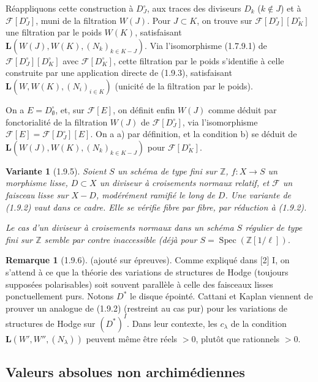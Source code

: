 \documentclass[12pt,a4paper]{article}
\theoremstyle{plain}
\newtheorem{variante}[theorem]{Variante}
\theoremstyle{definition}
\newtheorem{remark}[theorem]{Remarque}
\theoremstyle{remark}
\DeclareMathOperator{\Spec}{Spec}
\newcommand{\ZZ}{{\mathbb{Z}}}
\begin{document}
R\'eappliquons cette construction \`a $D_J^\circ$, aux traces des diviseurs $D_k$ ($k \notin J$) et \`a $\mathscr{F}[D_J^\circ]$, muni de la filtration $W(J)$. Pour $J \subset K$, on trouve sur $\mathscr{F}[D_J^\circ][D_K^\circ]$ une filtration par le poids $W(K)$, satisfaisant $\mathbf{L}(W(J), W(K), (N_k)_{k \in K-J})$. Via l'isomorphisme (1.7.9.1) de $\mathscr{F}[D_J^\circ][D_K^\circ]$ avec $\mathscr{F}[D_K^\circ]$, cette filtration par le poids s'identifie \`a celle construite par une application directe de (1.9.3), satisfaisant $\mathbf{L}(W, W(K), (N_i)_{i \in K})$ (unicit\'e de la filtration par le poids).

On a $E = D_\emptyset^\circ$, et, sur $\mathscr{F}[E]$, on d\'efinit enfin $W(J)$ comme d\'eduit par fonctorialit\'e de la filtration $W(J)$ de $\mathscr{F}[D_J^\circ]$, via l'isomorphisme $\mathscr{F}[E] = \mathscr{F}[D_J^\circ][E]$. On a a) par d\'efinition, et la condition b) se d\'eduit de $\mathbf{L}(W(J), W(K), (N_k)_{k \in K-J})$ pour $\mathscr{F}[D_K^\circ]$.


\begin{variante}[1.9.5]
Soient $S$ un sch\'ema de type fini sur $\ZZ$, $f : X \to S$ un morphisme lisse, $D \subset X$ un diviseur \`a croisements normaux relatif, et $\mathscr{F}$ un faisceau lisse sur $X - D$, mod\'er\'ement ramifi\'e le long de $D$. Une variante de (1.9.2) vaut dans ce cadre. Elle se v\'erifie fibre par fibre, par r\'eduction \`a (1.9.2).

Le cas d'un diviseur \`a croisements normaux dans un sch\'ema $S$ r\'egulier de type fini sur $\ZZ$ semble par contre inaccessible (d\'ej\`a pour $S = \Spec(\ZZ[1/\ell])$.
\end{variante}

\begin{remark}[1.9.6]
(ajout\'e sur \'epreuves). Comme expliqu\'e dans [2] I, on s'attend \`a ce que la th\'eorie des variations de structures de Hodge (toujours suppos\'ees polarisables) soit souvent parall\`ele \`a celle des faisceaux lisses ponctuellement purs. Notons $D^*$ le disque \'epoint\'e. Cattani et Kaplan viennent de prouver un analogue de (1.9.2) (restreint au cas pur) pour les variations de structures de Hodge sur $(D^*)^I$. Dans leur contexte, les $c_\lambda$ de la condition $\mathbf{L}(W', W'', (N_\lambda))$ peuvent m\^eme \^etre r\'eels $> 0$, plut\^ot que rationnels $> 0$.
\end{remark}


\subsection{Valeurs absolues non archim\'ediennes}
\end{document}

